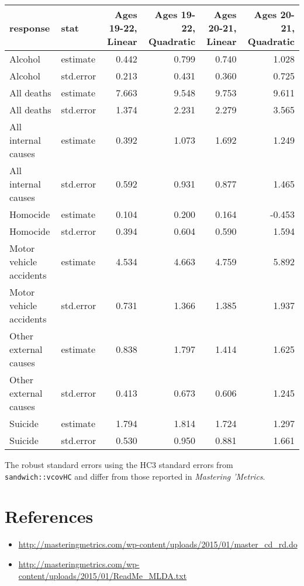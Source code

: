 \documentclass[]{book}
\providecommand{\tightlist}{%
  \setlength{\itemsep}{0pt}\setlength{\parskip}{0pt}}
\theoremstyle{definition}
\theoremstyle{definition}
\theoremstyle{definition}
\theoremstyle{remark}
\begin{document}
\begin{tabular}{l|l|r|r|r|r}
\hline
response & stat & Ages 19-22, Linear & Ages 19-22, Quadratic & Ages 20-21, Linear & Ages 20-21, Quadratic\\
\hline
Alcohol & estimate & 0.442 & 0.799 & 0.740 & 1.028\\
\hline
Alcohol & std.error & 0.213 & 0.431 & 0.360 & 0.725\\
\hline
All deaths & estimate & 7.663 & 9.548 & 9.753 & 9.611\\
\hline
All deaths & std.error & 1.374 & 2.231 & 2.279 & 3.565\\
\hline
All internal causes & estimate & 0.392 & 1.073 & 1.692 & 1.249\\
\hline
All internal causes & std.error & 0.592 & 0.931 & 0.877 & 1.465\\
\hline
Homocide & estimate & 0.104 & 0.200 & 0.164 & -0.453\\
\hline
Homocide & std.error & 0.394 & 0.604 & 0.590 & 1.594\\
\hline
Motor vehicle accidents & estimate & 4.534 & 4.663 & 4.759 & 5.892\\
\hline
Motor vehicle accidents & std.error & 0.731 & 1.366 & 1.385 & 1.937\\
\hline
Other external causes & estimate & 0.838 & 1.797 & 1.414 & 1.625\\
\hline
Other external causes & std.error & 0.413 & 0.673 & 0.606 & 1.245\\
\hline
Suicide & estimate & 1.794 & 1.814 & 1.724 & 1.297\\
\hline
Suicide & std.error & 0.530 & 0.950 & 0.881 & 1.661\\
\hline
\end{tabular}

The robust standard errors using the HC3 standard errors from
\texttt{sandwich::vcovHC} and differ from those reported in
\emph{Mastering 'Metrics}.

\section{References}\label{references-3}

\begin{itemize}
\tightlist
\item
  \url{http://masteringmetrics.com/wp-content/uploads/2015/01/master_cd_rd.do}
\item
  \url{http://masteringmetrics.com/wp-content/uploads/2015/01/ReadMe_MLDA.txt}
\end{itemize}
\end{document}
